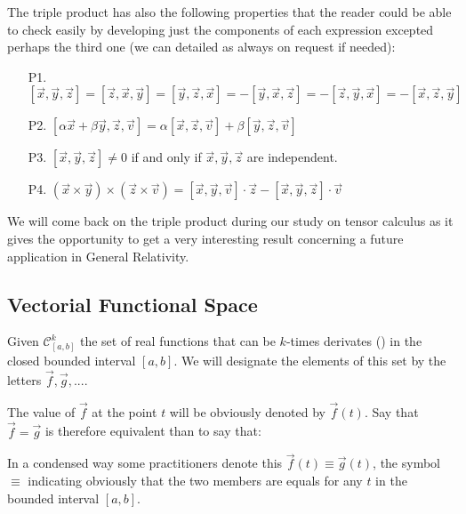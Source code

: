 	The triple product has also the following properties that the reader could be able to check easily by developing just the components of each expression excepted perhaps the third one (we can detailed as always on request if needed):
	\begin{enumerate}
		\item[P1.]  $[\vec{x},\vec{y},\vec{z}] =
	   [\vec{z},\vec{x},\vec{y}] =
	   [\vec{y},\vec{z},\vec{x}] =
	  -[\vec{y},\vec{x},\vec{z}] =
	  -[\vec{z},\vec{y},\vec{x}] =
	  -[\vec{x},\vec{z},\vec{y}]$
	  
	  \item[P2.] $[\alpha\vec{x}+\beta\vec{y},\vec{z},\vec{v}] =
	  \alpha[\vec{x},\vec{z},\vec{v}] +
	    \beta[\vec{y},\vec{z},\vec{v}]$
	    
	  \item[P3.] $[\vec{x},\vec{y},\vec{z}] \ne 0$ if and only if $\vec{x},\vec{y},\vec{z}$ are independent.
	  
	  \item[P4.] $(\vec{x}\times\vec{y})\times(\vec{z}\times\vec{v}) =
	  [\vec{x},\vec{y},\vec{v}] \cdot \vec{z} - [\vec{x},\vec{y},\vec{z}] \cdot \vec{v}$ 
	\end{enumerate}
	\begin{tcolorbox}[title=Remark,colframe=black,arc=10pt]
	We will come back on the triple product during our study on tensor calculus as it gives the opportunity to get a very interesting result concerning a future application in General Relativity.	
	\end{tcolorbox}
	
	\pagebreak
	\subsection{Vectorial Functional Space}
	Given $\mathcal{C}_{[a,b]}^k$ the set of real functions that can be $k$-times derivates () in the closed bounded interval $[a,b]$. We will designate the elements of this set by the letters $\vec{f},\vec{g},...$.
	
	The value of $\vec{f}$ at the point $t$ will be obviously denoted by $\vec{f}(t)$. Say that $\vec{f}=\vec{g}$ is therefore equivalent than to say that:
	 
	 In a condensed way some practitioners denote this $\vec{f}(t) \equiv \vec{g}(t)$, the symbol $\equiv$ indicating obviously that the two members are equals for any $t$ in the bounded interval $[a,b]$.
	 
